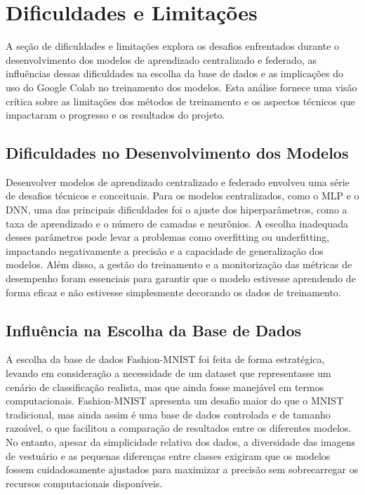 \section{Dificuldades e Limitações}

A seção de dificuldades e limitações explora os desafios enfrentados durante o desenvolvimento dos modelos de aprendizado centralizado e federado, as influências dessas dificuldades na escolha da base de dados e as implicações do uso do Google Colab no treinamento dos modelos. Esta análise fornece uma visão crítica sobre as limitações dos métodos de treinamento e os aspectos técnicos que impactaram o progresso e os resultados do projeto.

\subsection{Dificuldades no Desenvolvimento dos Modelos}

Desenvolver modelos de aprendizado centralizado e federado envolveu uma série de desafios técnicos e conceituais. Para os modelos centralizados, como o MLP e o DNN, uma das principais dificuldades foi o ajuste dos hiperparâmetros, como a taxa de aprendizado e o número de camadas e neurônios. A escolha inadequada desses parâmetros pode levar a problemas como overfitting ou underfitting, impactando negativamente a precisão e a capacidade de generalização dos modelos. Além disso, a gestão do treinamento e a monitorização das métricas de desempenho foram essenciais para garantir que o modelo estivesse aprendendo de forma eficaz e não estivesse simplesmente decorando os dados de treinamento.

\subsection{Influência na Escolha da Base de Dados}

A escolha da base de dados Fashion-MNIST foi feita de forma estratégica, levando em consideração a necessidade de um dataset que representasse um cenário de classificação realista, mas que ainda fosse manejável em termos computacionais. Fashion-MNIST apresenta um desafio maior do que o MNIST tradicional, mas ainda assim é uma base de dados controlada e de tamanho razoável, o que facilitou a comparação de resultados entre os diferentes modelos. No entanto, apesar da simplicidade relativa dos dados, a diversidade das imagens de vestuário e as pequenas diferenças entre classes exigiram que os modelos fossem cuidadosamente ajustados para maximizar a precisão sem sobrecarregar os recursos computacionais disponíveis.

